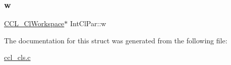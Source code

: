 \mbox{\label{struct_int_cl_par_a1b7adafbc56d9fdb5edbe80c950062b6}} 
\subsubsection{\texorpdfstring{w}{w}}
{\footnotesize\ttfamily \mbox{\hyperlink{struct_c_c_l___cl_workspace}{C\+C\+L\+\_\+\+Cl\+Workspace}}$\ast$ Int\+Cl\+Par\+::w}



The documentation for this struct was generated from the following file\+:\begin{DoxyCompactItemize}
\item 
\mbox{\hyperlink{ccl__cls_8c}{ccl\+\_\+cls.\+c}}\end{DoxyCompactItemize}
